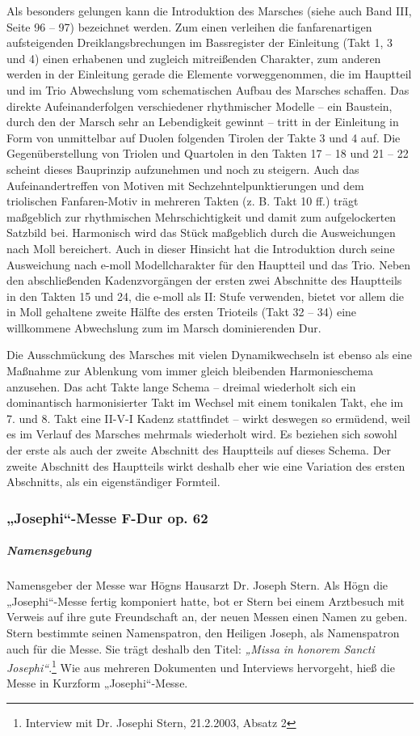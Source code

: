 \documentclass[a4paper]{article}
\newcommand\zitat[1]{\textit{#1}}
\begin{document}
Als besonders gelungen kann die Introduktion des Marsches (siehe auch
Band III, Seite 96 – 97) bezeichnet werden. Zum einen verleihen die
fanfarenartigen aufsteigenden Dreiklangsbrechungen im Bassregister der
Einleitung (Takt 1, 3 und 4) einen erhabenen und zugleich mitreißenden
Charakter, zum anderen werden in der Einleitung gerade die Elemente
vorweggenommen, die im Hauptteil und im Trio Abwechslung vom
schematischen Aufbau des Marsches schaffen. Das direkte
Aufeinanderfolgen verschiedener rhythmischer Modelle – ein Baustein,
durch den der Marsch sehr an Lebendigkeit gewinnt – tritt in der
Einleitung in Form von unmittelbar auf Duolen folgenden Tirolen der
Takte 3 und 4 auf. Die Gegenüberstellung von Triolen und Quartolen in
den Takten 17 – 18 und 21 – 22 scheint dieses Bauprinzip aufzunehmen
und noch zu steigern. Auch das Aufeinandertreffen von Motiven mit
Sechzehntelpunktierungen und dem triolischen Fanfaren-Motiv in mehreren
Takten (z. B. Takt 10 ff.) trägt maßgeblich zur rhythmischen
Mehrschichtigkeit und damit zum aufgelockerten Satzbild bei. Harmonisch
wird das Stück maßgeblich durch die Ausweichungen nach Moll bereichert.
Auch in dieser Hinsicht hat die Introduktion durch seine Ausweichung
nach e-moll Modellcharakter für den Hauptteil und das Trio. Neben den
abschließenden Kadenzvorgängen der ersten zwei Abschnitte des
Hauptteils in den Takten 15 und 24, die e-moll als II: Stufe verwenden,
bietet vor allem die in Moll gehaltene zweite Hälfte des ersten
Trioteils (Takt 32 – 34) eine willkommene Abwechslung zum im Marsch
dominierenden Dur.

Die Ausschmückung des Marsches mit vielen Dynamikwechseln ist ebenso als
eine Maßnahme zur Ablenkung vom immer gleich bleibenden Harmonieschema
anzusehen. Das acht Takte lange Schema – dreimal wiederholt sich ein
dominantisch harmonisierter Takt im Wechsel mit einem tonikalen Takt,
ehe im 7. und 8. Takt eine\newline
II-V-I Kadenz stattfindet – wirkt deswegen so ermüdend, weil es im
Verlauf des Marsches mehrmals wiederholt wird. Es beziehen sich sowohl
der erste als auch der zweite Abschnitt des Hauptteils auf dieses
Schema. Der zweite Abschnitt des Hauptteils wirkt deshalb eher wie eine
Variation des ersten Abschnitts, als ein eigenständiger Formteil.

\subsubsection[„Josephi“{}-Messe F{}-Dur op. 62]{„Josephi“-Messe F-Dur
op. 62}
\label{bkm:Ref98506951}\hypertarget{RefHeadingToc100333755}{}\label{bkm:Ref98506963}\label{bkm:Ref98506955}\subparagraph{Namensgebung}
Namensgeber der Messe war Högns Hausarzt Dr. Joseph Stern. Als Högn die
„Josephi“-Messe fertig komponiert hatte, bot er Stern bei einem
Arztbesuch mit Verweis auf ihre gute Freundschaft an, der neuen Messen
einen Namen zu geben. Stern bestimmte seinen Namenspatron, den Heiligen
Joseph, als Namenspatron auch für die Messe. Sie trägt deshalb den
Titel: \zitat{„Missa in honorem Sancti Josephi“}.\footnote{
Interview mit Dr. Josephi Stern, 21.2.2003, Absatz 2} Wie aus mehreren
Dokumenten und Interviews hervorgeht, hieß die Messe in Kurzform
„Josephi“-Messe.
\end{document}

